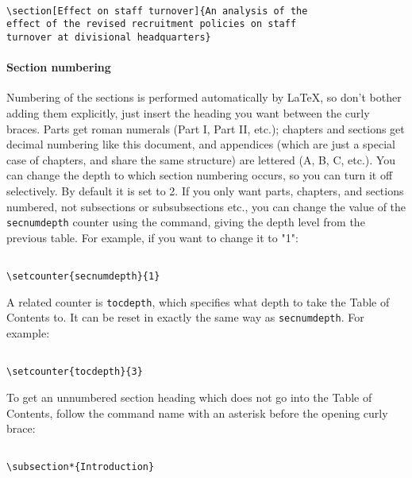 \begin{lstlisting}

\section[Effect on staff turnover]{An analysis of the
effect of the revised recruitment policies on staff
turnover at divisional headquarters}

\end{lstlisting}


\paragraph{ Section numbering }

Numbering of the sections is performed automatically by LaTeX, so don't bother adding them explicitly, just insert the heading you want between the curly braces. 
Parts get roman numerals (Part I, Part II, etc.); chapters and sections get decimal numbering like this document, and appendices (which are just a special case of chapters, and share the same structure) are lettered (A, B, C, etc.). You can change the depth to which section numbering occurs, so you can turn it off selectively. By default it is set to 2. If you only want parts, chapters, and sections numbered, not subsections or subsubsections etc., you can change the value
of the \texttt{secnumdepth} counter using the \texttt{\setcounter} command, giving the depth level from the previous table. For example, if you want to change it to "1":

\begin{lstlisting}

\setcounter{secnumdepth}{1}

\end{lstlisting}


A related counter is \texttt{tocdepth}, which specifies what depth to take the Table of Contents to. It can be reset in exactly the
same way as \texttt{secnumdepth}. For example:

\begin{lstlisting}

\setcounter{tocdepth}{3}

\end{lstlisting}


To get an unnumbered section heading which does not go into the Table of Contents, follow the command name with an asterisk before the opening curly brace:

\begin{lstlisting}

\subsection*{Introduction}

\end{lstlisting}


